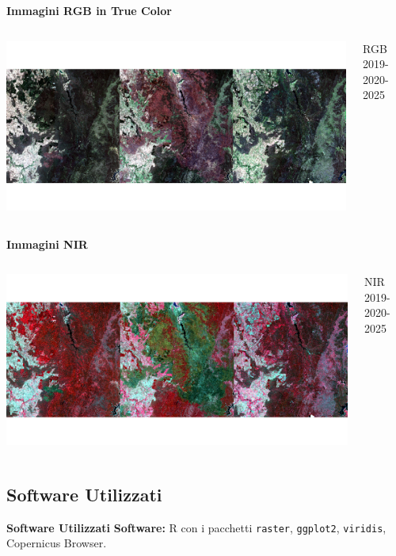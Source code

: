 \documentclass{beamer}
\begin{document}
\begin{frame}{\textbf{Immagini RGB in True Color}}
\begin{columns}
    \centering
    \includegraphics[width=\textwidth]{RGB_comparison.png}
    \caption{RGB 2019-2020-2025}
\end{columns}
\end{frame}

\begin{frame}{\textbf{Immagini NIR}}
\begin{columns}
    \centering
    \includegraphics[width=\textwidth]{RGB_comparison_2.png}
    \caption{NIR 2019-2020-2025}
\end{columns}
\end{frame}

\subsection{Software Utilizzati}

\begin{frame}{\textbf{Software Utilizzati}}
\textbf{Software:} R con i pacchetti \texttt{raster}, \texttt{ggplot2}, \texttt{viridis}, Copernicus Browser.
\end{frame}
\end{document}
